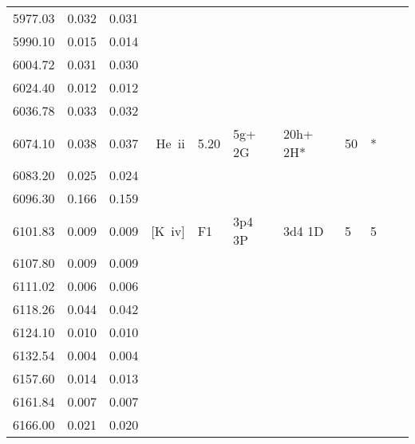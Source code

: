 \begin{longtable}{lrlrlllllll}
 5977.03 &   0.032 &   0.031                                                                                      \\
 5990.10 &   0.015 &   0.014                                                                                      \\
 6004.72 &   0.031 &   0.030                                                                                      \\
 6024.40 &   0.012 &   0.012                                                                                      \\
 6036.78 &   0.033 &   0.032                                                                                      \\
 6074.10 &   0.038 &   0.037 &  He~{\sc ii}     &  5.20      &  5g+ 2G    &  20h+ 2H*  &         50 &        *    \\
 6083.20 &   0.025 &   0.024                                                                                      \\
 6096.30 &   0.166 &   0.159                                                                                      \\
 6101.83 &   0.009 &   0.009 &  [K~{\sc iv}]    &  F1        &  3p4 3P    &  3d4 1D    &          5 &        5    \\
 6107.80 &   0.009 &   0.009                                                                                      \\
 6111.02 &   0.006 &   0.006                                                                                      \\
 6118.26 &   0.044 &   0.042                                                                                      \\
 6124.10 &   0.010 &   0.010                                                                                      \\
 6132.54 &   0.004 &   0.004                                                                                      \\
 6157.60 &   0.014 &   0.013                                                                                      \\
 6161.84 &   0.007 &   0.007                                                                                      \\
 6166.00 &   0.021 &   0.020                                                                                      \\

\end{longtable}
